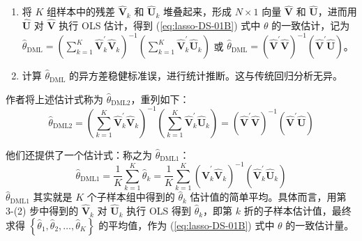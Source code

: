 {\begin{enumerate}
\begin{enumerate}
   \item 获取第 $k$ 折样本的残差。将 $\hat{\gamma}_{-k}$ 和 $\widehat{\eta}_{-k}$ 带入第 $k$ 折样本 $S_{k}$，计算 (\ref{eq:lasso-Hansen2021-29-23}) 和 (\ref{eq:lasso-Hansen2021-29-24}) 式对应的残差  $\widehat{\boldsymbol{V}}_{k}=\boldsymbol{D}_{k}-\boldsymbol{X}_{k} \widehat{\gamma}_{-k}$ and $\widehat{\boldsymbol{U}}_{k}=\boldsymbol{Y}_{k}-\boldsymbol{X}_{k} \widehat{\eta}_{-k}$。简言之，采用基于 $\S_{-k}$ 样本估得的参数来预测 $S_k$ 样本中的残差。
   \end{enumerate}
\item 将 $K$ 组样本中的残差 $\widehat{\boldsymbol{V}}_{k}$ 和 $\widehat{\boldsymbol{U}}_{k}$ 堆叠起来，形成 $N \times 1$ 向量 $\widehat{\boldsymbol{V}}$ 和 $\widehat{\boldsymbol{U}}$，进而用 $\widehat{\boldsymbol{U}}$ 对 $\widehat{\boldsymbol{V}}$ 执行 OLS 估计，得到 (\ref{eq:lasso-DS-01B}) 式中 $\theta$ 的一致估计，记为  $\widehat{\theta}_{\mathrm{DML}}=\left(\sum_{k=1}^{K} \widehat{\boldsymbol{V}}_{k}^{\prime} \widehat{\boldsymbol{V}}_{k}\right)^{-1}\left(\sum_{k=1}^{K} \widehat{\boldsymbol{V}}_{k}^{\prime} \widehat{\boldsymbol{U}}_{k}\right)$ 或 $\widehat{\theta}_{\mathrm{DML}}=(\widehat{\boldsymbol{V}}^{\prime} \widehat{\boldsymbol{V}})^{-1}(\widehat{\boldsymbol{V}}^{\prime} \widehat{\boldsymbol{U}})$。
\item 计算 $\widehat{\theta}_{\mathrm{DML}}$ 的异方差稳健标准误，进行统计推断。这与传统回归分析无异。
\end{enumerate}

作者将上述估计式称为 $\widehat{\theta}_{\mathrm{DML2}}$，重列如下：
\begin{equation}\label{eq:lasso-DML-01}
	 \widehat{\theta}_{\mathrm{DML2}}
	 =
	 \left(\sum_{k=1}^{K} \widehat{\boldsymbol{V}}_{k}^{\prime} \widehat{\boldsymbol{V}}_{k}\right)^{-1}\left(\sum_{k=1}^{K} \widehat{\boldsymbol{V}}_{k}^{\prime} \widehat{\boldsymbol{U}}_{k}\right)
	 =
	 \left(\widehat{\boldsymbol{V}}^{\prime} \widehat{\boldsymbol{V}}\right)^{-1}\left(\widehat{\boldsymbol{V}}^{\prime} \widehat{\boldsymbol{U}}\right)
\end{equation}

他们还提供了一个估计式：称之为 $\widehat{\theta}_{\mathrm{DML1}}$：
\begin{equation}\label{eq:lasso-DML-02}
	 \widehat{\theta}_{\mathrm{DML1}}
	 = 
	 \frac{1}{K}
	 	 \sum_{k=1}^{K}\widehat{\theta}_k
	 = 
	 \frac{1}{K}
	 \sum_{k=1}^{K}\left(\widehat{\boldsymbol{V}}_{k}^{\prime} \widehat{\boldsymbol{V}}_{k}\right)^{-1}\left(\widehat{\boldsymbol{V}}_{k}^{\prime} \widehat{\boldsymbol{U}}_{k}\right)
\end{equation}
$\widehat{\theta}_{\mathrm{DML1}}$ 其实就是 $K$ 个子样本组中得到的 $\widehat{\theta}_k$ 估计值的简单平均。具体而言，用第 3-(2) 步中得到的 $\widehat{\boldsymbol{V}}_{k}$ 对 $\widehat{\boldsymbol{U}}_{k}$ 执行 OLS 得到 $\widehat{\theta}_k$，即第 $k$ 折的子样本估计值，最终求得 $\left\{\widehat{\theta}_1, \widehat{\theta}_2, \ldots, \widehat{\theta}_K \right\}$ 的平均值，作为 (\ref{eq:lasso-DS-01B}) 式中 $\theta$ 的一致估计量。

}
